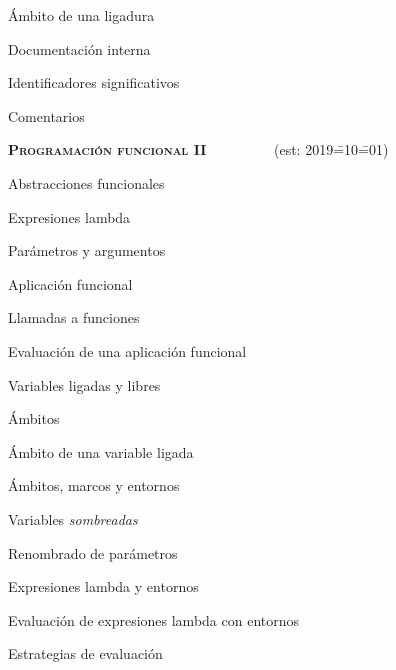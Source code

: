 \begin{longenum}
\begin{longenum}
\begin{longenum}
            \item Ámbito de una ligadura
        \end{longenum}
        \item Documentación interna
        \begin{longenum}
            \item Identificadores significativos
            \item Comentarios
        \end{longenum}
    \end{longenum}
    \item \textbf{\textsc{Programación funcional II}} \ \ \ \ \ \ \ \ \ (est: 2019\==10\==01)
    \begin{longenum}
        \item Abstracciones funcionales
        \begin{longenum}
            \item Expresiones lambda
            \begin{longenum}
                \item Parámetros y argumentos
                \item Aplicación funcional
                \begin{longenum}
                    \item Llamadas a funciones
                    \item Evaluación de una aplicación funcional
                \end{longenum}
                \item Variables ligadas y libres
                \item Ámbitos
                \begin{longenum}
                    \item Ámbito de una variable ligada
                    \item Ámbitos, marcos y entornos
                    \item Variables \textit{sombreadas}
                    \item Renombrado de parámetros
                    \item Expresiones lambda y entornos
                    \item Evaluación de expresiones lambda con entornos
                \end{longenum}
            \end{longenum}
            \item Estrategias de evaluación

\end{longenum}
\end{longenum}
\end{longenum}
